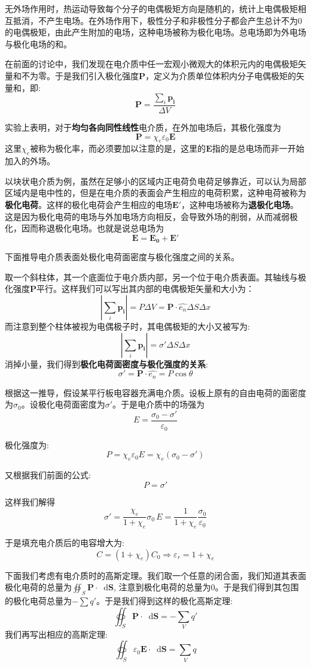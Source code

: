 \documentclass[12pt,a4paper,oneside]{report}
\theoremstyle{definition}
\theoremstyle{remark}
\renewcommand{\d}{\mathop{}\!\mathrm{d}}
\begin{document}
无外场作用时，热运动导致每个分子的电偶极矩方向是随机的，统计上电偶极矩相互抵消，不产生电场。在外场作用下，极性分子和非极性分子都会产生总计不为0的电偶极矩，由此产生附加的电场，这种电场被称为极化电场。总电场即为外电场与极化电场的和。

在前面的讨论中，我们发现在电介质中任一宏观小微观大的体积元内的电偶极矩矢量和不为零。于是我们引入极化强度$\mathbf{P}$，定义为介质单位体积内分子电偶极矩的矢量和，即:
\[
\mathbf{P}=\frac{\sum_i \mathbf{p_i}}{\Delta V}
\]

实验上表明，对于\textbf{均匀各向同性线性}电介质，在外加电场后，其极化强度为
\[
\mathbf{P}=\chi_e \varepsilon_0 \mathbf{E}
\]
这里$\chi_e$被称为极化率，而必须要加以注意的是，这里的$\mathbf{E}$指的是总电场而非一开始加入的外场。

以块状电介质为例，虽然在足够小的区域内正电荷负电荷足够靠近，可以认为局部区域内是电中性的，但是在电介质的表面会产生相应的电荷积累，这种电荷被称为\textbf{极化电荷}。这样的极化电荷会产生相应的电场$\mathbf{E'}$，这种电场被称为\textbf{退极化电场}。这是因为极化电荷的电场与外加电场方向相反，会导致外场的削弱，从而减弱极化，因而称退极化电场。也就是说总电场为
\[
\mathbf{E}=\mathbf{E_0}+\mathbf{E'}
\]

下面推导电介质表面处极化电荷面密度与极化强度之间的关系。

取一个斜柱体，其一个底面位于电介质内部，另一个位于电介质表面。其轴线与极化强度$\mathbf{P}$平行。这样我们可以写出其内部的电偶极矩矢量和大小为：
\[
|\sum_i\mathbf{p_i}|=P\Delta V = \mathbf{P} \cdot \hat{e_n} \Delta S \Delta x
\]
而注意到整个柱体被视为电偶极子时，其电偶极矩的大小又被写为:
\[
|\sum_i\mathbf{p_i}| = \sigma' \Delta S \Delta x
\]
消掉小量，我们得到\textbf{极化电荷面密度与极化强度的关系}:
\[
\sigma' = \mathbf{P} \cdot \hat{e_n} = P\cos\theta
\]

根据这一推导，假设某平行板电容器充满电介质。设板上原有的自由电荷的面密度为$\sigma_0$。设极化电荷面密度为$\sigma'$。于是电介质中的场强为 
\[
E=\frac{\sigma_0-\sigma'}{\varepsilon_0}
\]

极化强度为:
\[
P=\chi_e\varepsilon_0 E=\chi_e(\sigma_0-\sigma')
\]

又根据我们前面的公式:
\[
P=\sigma'
\]

这样我们解得
\[
\sigma' = \frac{\chi_e}{1+\chi_e}\sigma_0 \, E= \frac{1}{1+\chi_e} \frac{\sigma_0}{\varepsilon_0}
\]

于是填充电介质后的电容增大为:
\[
C=(1+\chi_e)C_0 \Rightarrow \varepsilon_r = 1+\chi_e
\]

下面我们考虑有电介质时的高斯定理。我们取一个任意的闭合面，我们知道其表面极化电荷的总量为$\oiint_S \mathbf{P} \cdot \d \mathbf{S}$, 注意到极化电荷的总量为0。于是我们得到其包围的极化电荷总量为$-\sum q'$。于是我们得到这样的极化高斯定理:
\[
\oiint_S \mathbf{P} \cdot \d \mathbf{S}  = -\sum_V q'
\]
我们再写出相应的高斯定理:
\[
\oiint_S \varepsilon_0 \mathbf{E} \cdot \d \mathbf{S}  = \sum_V q
\]
\end{document}

